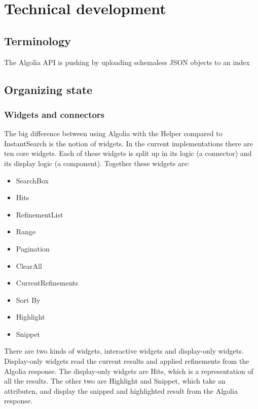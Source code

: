 
\chapter{Technical development} %
\label{chp:execution}

\section{Terminology}
\label{sec:terminology}

The Algolia API is pushing by uploading schemaless JSON objects to an index

\section{Organizing state} %
\label{sec:organizing_state}

\subsection{Widgets and connectors}
\label{sub:widgets_and_connectors}

The big difference between using Algolia with the Helper compared to InstantSearch is the notion of widgets. In the current implementations there are ten core widgets. Each of these widgets is split up in its logic (a connector) and its display logic (a component). Together these widgets are:

\begin{itemize}
  \item SearchBox
  \item Hits
  \item RefinementList
  \item Range
  \item Pagination
  \item ClearAll
  \item CurrentRefinements
  \item Sort By
  \item Highlight
  \item Snippet
\end{itemize}

There are two kinds of widgets, interactive widgets and display-only widgets. Display-only widgets read the current results and applied refinements from the Algolia response. The display-only widgets are Hits, which is a representation of all the results. The other two are Highlight and Snippet, which take an attributen, and display the snipped and highlighted result from the Algolia response.

